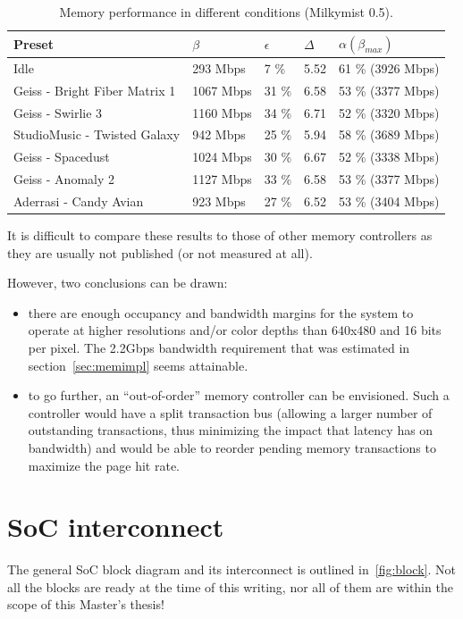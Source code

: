 \documentclass[a4paper,11pt]{kthesis}
\begin{document}
\begin{table}
\centering
\begin{tabular}{|l|l|l|l|l|}
\hline
\textbf{Preset} & $\beta$ & $\epsilon$ & $\Delta$ & $\alpha(\beta_{max})$ \\
\hline
Idle & 293 Mbps & 7 \% & 5.52 & 61 \% (3926 Mbps) \\
\hline
Geiss - Bright Fiber Matrix 1 & 1067 Mbps & 31 \% & 6.58 & 53 \% (3377 Mbps) \\
\hline
Geiss - Swirlie 3 & 1160 Mbps & 34 \% & 6.71 & 52 \% (3320 Mbps) \\
\hline
StudioMusic - Twisted Galaxy & 942 Mbps & 25 \% & 5.94 & 58 \% (3689 Mbps) \\
\hline
Geiss - Spacedust & 1024 Mbps & 30 \% & 6.67 & 52 \% (3338 Mbps) \\
\hline
Geiss - Anomaly 2 & 1127 Mbps & 33 \% & 6.58 & 53 \% (3377 Mbps) \\
\hline
Aderrasi - Candy Avian & 923 Mbps & 27 \% & 6.52 & 53 \% (3404 Mbps) \\
\hline
\end{tabular}
\caption{Memory performance in different conditions (Milkymist 0.5).} \label{tab:memperformance}
\end{table}

It is difficult to compare these results to those of other memory controllers as they are usually not published (or not measured at all).

However, two conclusions can be drawn:
\begin{itemize}
\item there are enough occupancy and bandwidth margins for the system to operate at higher resolutions and/or color depths than 640x480 and 16 bits per pixel. The 2.2Gbps bandwidth requirement that was estimated in section~\ref{sec:memimpl} seems attainable.
\item to go further, an ``out-of-order'' memory controller can be envisioned. Such a controller would have a split transaction bus (allowing a larger number of outstanding transactions, thus minimizing the impact that latency has on bandwidth) and would be able to reorder pending memory transactions to maximize the page hit rate.
\end{itemize}

\chapter{SoC interconnect}
The general SoC block diagram and its interconnect is outlined in~\ref{fig:block}. Not all the blocks are ready at the time of this writing, nor all of them are within the scope of this Master's thesis!
\end{document}
